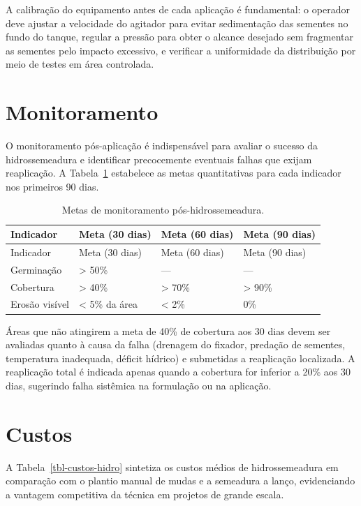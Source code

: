 \documentclass[
  portuguese,
  11pt,
  a4paper,
  open=any]{scrbook}
\begin{document}
A calibração do equipamento antes de cada aplicação é fundamental: o
operador deve ajustar a velocidade do agitador para evitar sedimentação
das sementes no fundo do tanque, regular a pressão para obter o alcance
desejado sem fragmentar as sementes pelo impacto excessivo, e verificar
a uniformidade da distribuição por meio de testes em área controlada.

\section{Monitoramento}\label{monitoramento}

O monitoramento pós-aplicação é indispensável para avaliar o sucesso da
hidrossemeadura e identificar precocemente eventuais falhas que exijam
reaplicação. A Tabela~\ref{tbl-monitoramento} estabelece as metas
quantitativas para cada indicador nos primeiros 90 dias.

\begin{longtable}[]{@{}llll@{}}
\caption{Metas de monitoramento
pós-hidrossemeadura.}\label{tbl-monitoramento}\tabularnewline
\toprule\noalign{}
Indicador & Meta (30 dias) & Meta (60 dias) & Meta (90 dias) \\
\midrule\noalign{}
\endfirsthead
\toprule\noalign{}
Indicador & Meta (30 dias) & Meta (60 dias) & Meta (90 dias) \\
\midrule\noalign{}
\endhead
\bottomrule\noalign{}
\endlastfoot
Germinação & \textgreater{} 50\% & --- & --- \\
Cobertura & \textgreater{} 40\% & \textgreater{} 70\% & \textgreater{}
90\% \\
Erosão visível & \textless{} 5\% da área & \textless{} 2\% & 0\% \\
\end{longtable}

Áreas que não atingirem a meta de 40\% de cobertura aos 30 dias devem
ser avaliadas quanto à causa da falha (drenagem do fixador, predação de
sementes, temperatura inadequada, déficit hídrico) e submetidas a
reaplicação localizada. A reaplicação total é indicada apenas quando a
cobertura for inferior a 20\% aos 30 dias, sugerindo falha sistêmica na
formulação ou na aplicação.

\section{Custos}\label{custos-1}

A Tabela~\ref{tbl-custos-hidro} sintetiza os custos médios de
hidrossemeadura em comparação com o plantio manual de mudas e a
semeadura a lanço, evidenciando a vantagem competitiva da técnica em
projetos de grande escala.
\end{document}
